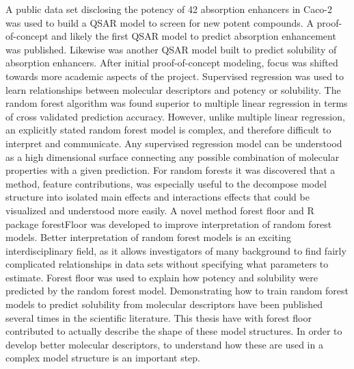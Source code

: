 A public data set disclosing the potency of 42 absorption enhancers in Caco-2 was used to build a QSAR model to screen for new potent compounds. A proof-of-concept and likely the first QSAR model to predict absorption enhancement was published. Likewise was another QSAR model built to predict solubility of absorption enhancers. After initial proof-of-concept modeling, focus was shifted towards more academic aspects of the project. Supervised regression was used to learn relationships between molecular descriptors and potency or solubility. The random forest algorithm was found superior to multiple linear regression in terms of cross validated prediction accuracy. However, unlike multiple linear regression, an explicitly stated random forest model is complex, and therefore difficult to interpret and communicate. Any supervised regression model can be understood as a high dimensional surface connecting any possible combination of molecular properties with a given prediction. For random forests it was discovered that a method, feature contributions, was especially useful to the decompose model structure into isolated main effects and interactions effects that could be visualized and understood more easily. A novel method forest floor and R package forestFloor was developed to improve interpretation of random forest models. Better interpretation of random forest models is an exciting interdisciplinary field, as it allows investigators of many background to find fairly complicated relationships in data sets without specifying what parameters to estimate. Forest floor was used to explain how potency and solubility were predicted by the random forest model. Demonstrating how to train random forest models to predict solubility from molecular descriptors have been published several times in the scientific literature. This thesis have with forest floor contributed to actually describe the shape of these model structures. In order to develop better molecular descriptors, to understand how these are used in a complex model structure is an important step.